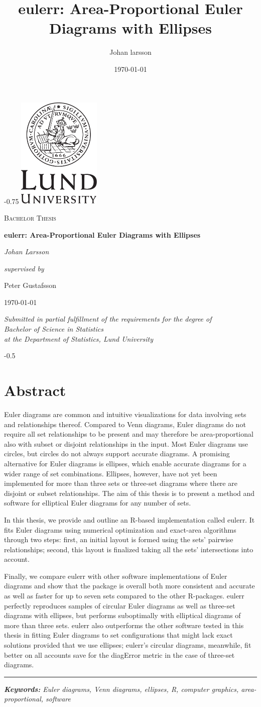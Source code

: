 \documentclass[
  oneside,
  openany,
  numbers=noendperiod,
  parskip=half,
  bibliography=totoc
]{scrbook}\usepackage[]{graphicx}\usepackage{xcolor}
\title{eulerr: Area-Proportional Euler Diagrams with Ellipses}
\author{Johan larsson}
\date{\today}
\renewcommand{\maketitle}{%
  \cleardoublepage
  \begin{addmargin*}[0.25\overhang]{-0.75\overhang}%
    \centering
    \vspace*{2cm}
    \includegraphics[width=0.3\textwidth]{LundUniversity_C2line_BLACK}\par\vspace{1cm}
    \vspace{0.5cm}
    {\scshape\Large Bachelor Thesis \par}
    {\Huge\bfseries eulerr: Area-Proportional Euler Diagrams with Ellipses \par}
    \vspace{2cm}
    {\huge\itshape Johan Larsson \par}
    \vspace{2cm}
    {\Large{\itshape supervised by}\par Peter Gustafsson}
    \vfill
    {\Large \today\par}
    \vfill
    {\large \itshape Submitted in partial fulfillment of the requirements for the degree of\\
      Bachelor of Science in Statistics\\
      at the Department of Statistics, Lund University}
  \end{addmargin*}%
  \thispagestyle{empty}
}
\newlength{\overhang}
\begin{document}
\frontmatter
\maketitle

\begin{addmargin*}[0.5\overhang]{-0.5\overhang}
{\hypersetup{linkcolor=black}
\tableofcontents
}

\chapter*{Abstract}

Euler diagrams are common and intuitive visualizations for data involving
sets and relationships thereof. Compared to Venn diagrams, Euler diagrams do not
require all set relationships to be present and may therefore be area-proportional
also with subset or disjoint relationships in the input.
Most Euler diagrams use circles, but circles do not always
support accurate diagrams. A promising alternative for Euler diagrams is ellipses,
which enable accurate diagrams for a wider range
of set combinations. Ellipses, however, have not yet
been implemented for more than three sets or three-set diagrams where
there are disjoint or subset relationships. The aim of this thesis is
to present a method and software for elliptical Euler diagrams for any
number of sets.

In this thesis, we provide and outline an R-based implementation called eulerr.
It fits Euler diagrams using numerical optimization and exact-area
algorithms through two steps: first, an initial layout is formed using
the sets' pairwise relationships; second, this layout is finalized
taking all the sets' intersections into account.

Finally, we compare eulerr with other software implementations of Euler
diagrams and show that the package
is overall both more consistent and accurate as well as
faster for up to seven sets compared to the other R-packages. eulerr perfectly
reproduces samples of circular Euler diagrams as well
as three-set diagrams with ellipses, but performs suboptimally with elliptical
diagrams of more than three sets. eulerr also outperforms the other software tested in
this thesis in fitting Euler diagrams to set configurations that might
lack exact solutions provided that we use ellipses; eulerr's circular diagrams,
meanwhile, fit better
on all accounts save for the diagError metric in the case of three-set diagrams.

\par\noindent\rule{\textwidth}{0.5pt}
\itshape\noindent\textbf{Keywords:} Euler diagrams, Venn diagrams, ellipses, R,
computer graphics, area-proportional, software

\end{addmargin*}
\mainmatter
\end{document}
